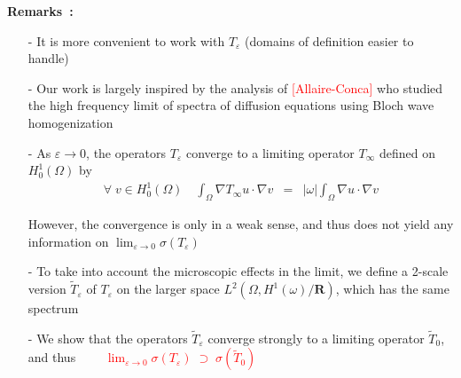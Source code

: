 \documentclass[mathserif,9pt]{beamer}
\def\e{{\varepsilon}}
\def\ds{\displaystyle}
\def\R{\mathbf R}
\begin{document}
\begin{frame}
\small{

\vspace*{10mm}

\textcolor{ox}{\bf Remarks~:} 
\begin{itemize}
\item[-]
It is more convenient to work with $T_\e$ (domains of definition easier to handle)
\medskip

\item[-]
Our work is largely inspired by the analysis of \textcolor{red}{[Allaire-Conca]}
who studied the high frequency limit of spectra of diffusion equations using
Bloch wave homogenization
\medskip

\item[-]
As $\e \to 0$, the operators $T_\e$ converge to a limiting operator $T_\infty$
defined on $H^1_0(\Omega)$ by
\begin{eqnarray*}
\forall\; v \in H^1_0(\Omega)\quad
\ds\int_\Omega \nabla T_\infty u\cdot \nabla v
&=&
|\omega|
\ds\int_\Omega \nabla u\cdot \nabla v
\end{eqnarray*}

However, the convergence is only in a weak sense, and thus does not yield any
information on $\lim_{\e \to 0} \sigma(T_\e)$
\medskip

\item[-]
To take into account the microscopic effects in the limit, we
define a 2-scale version $\tilde{T}_\e$ of $T_\e$ on the larger
space $L^2(\Omega, H^1(\omega)/\R)$, which has the same spectrum
\medskip

\item[-]
We show that the operators $\tilde{T}_\e$ converge strongly to a
limiting operator $\tilde{T}_0$, and thus
\textcolor{red}{
$\quad\quad \lim_{\e \to 0} \sigma(T_\e) \;\supset\; \sigma(\tilde{T}_0)$}
\end{itemize}


}
\end{frame}
\end{document}
